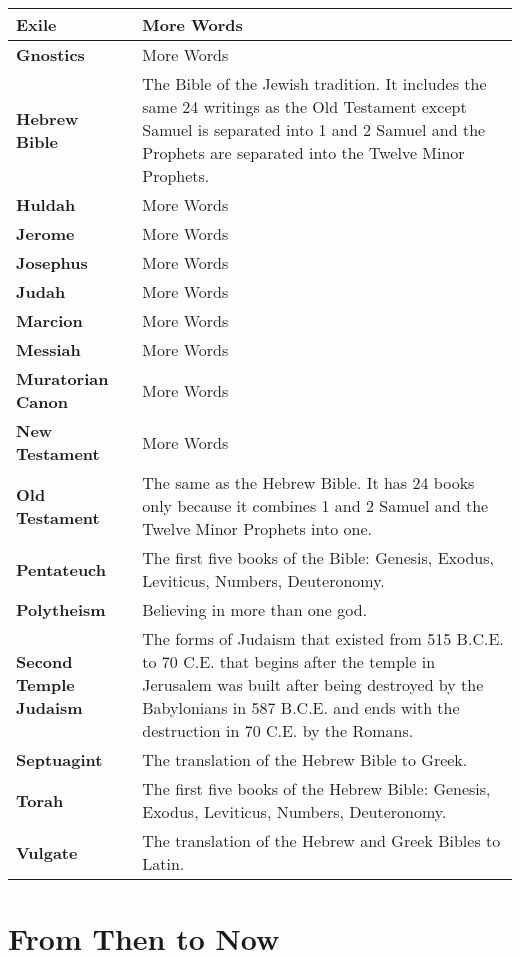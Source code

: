 \documentclass{report}
\begin{document}
\begin{center}
\begin{longtable}{| p{5cm} | p{10cm} |}
            \textbf{Exile} & More Words \\ \hline
            \textbf{Gnostics} & More Words \\ \hline
            \textbf{Hebrew Bible} & The Bible of the Jewish tradition. It includes the same 24 writings as the Old Testament except Samuel is separated into 1 and 2 Samuel and the Prophets are separated into the Twelve Minor Prophets.\\ \hline
            \textbf{Huldah} & More Words \\ \hline
            \textbf{Jerome} & More Words \\ \hline
            \textbf{Josephus} & More Words \\ \hline
            \textbf{Judah} & More Words \\ \hline
            \textbf{Marcion} & More Words \\ \hline
            \textbf{Messiah} & More Words \\ \hline
            \textbf{Muratorian Canon} & More Words \\ \hline
            \textbf{New Testament} & More Words \\ \hline
            \textbf{Old Testament} & The same as the Hebrew Bible. It has 24 books only because it combines 1 and 2 Samuel and the Twelve Minor Prophets into one.\\ \hline
            \textbf{Pentateuch} & The first five books of the Bible: Genesis, Exodus, Leviticus, Numbers, Deuteronomy.\\ \hline
            \textbf{Polytheism} & Believing in more than one god.\\ \hline
            \textbf{Second Temple Judaism} & The forms of Judaism that existed from 515 B.C.E. to 70 C.E. that begins after the temple in Jerusalem was built after being destroyed by the Babylonians in 587 B.C.E. and ends with the destruction in 70 C.E. by the Romans.\\ \hline
            \textbf{Septuagint} & The translation of the Hebrew Bible to Greek.\\ \hline
            \textbf{Torah} & The first five books of the Hebrew Bible: Genesis, Exodus, Leviticus, Numbers, Deuteronomy.\\ \hline
            \textbf{Vulgate} & The translation of the Hebrew and Greek Bibles to Latin.\\ \hline
        \end{longtable}
        \end{center}
    \chapter{From Then to Now}
\end{document}
